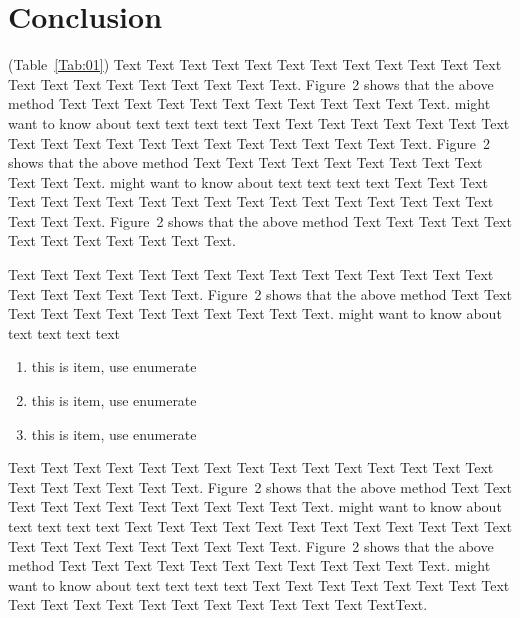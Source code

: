 \documentclass{bioinfo}
\begin{document}
%
%






\section{Conclusion}

(Table~\ref{Tab:01}) Text Text Text Text Text Text  Text Text Text
Text Text Text Text Text Text  Text Text Text Text Text Text.
Figure~2\vphantom{\ref{fig:02}} shows that the above method  Text
Text Text Text  Text Text Text Text Text Text  Text Text.
\citealp{Boffelli03} might want to know about  text text text text
Text Text Text Text Text Text  Text Text Text Text Text Text Text
Text Text  Text Text Text Text Text Text.
Figure~2\vphantom{\ref{fig:02}} shows that the above method  Text
Text Text Text  Text Text Text Text Text Text  Text Text.
\citealp{Boffelli03} might want to know about  text text text text
Text Text Text Text Text Text Text Text Text Text Text Text Text
Text Text  Text Text Text Text Text Text.
Figure~2\vphantom{\ref{fig:02}} shows that the above method  Text
Text Text Text  Text Text Text Text Text Text  Text Text.



Text Text Text Text Text Text  Text Text Text Text Text Text Text
Text Text  Text Text Text Text Text Text.
Figure~2\vphantom{\ref{fig:02}} shows that the above method  Text
Text Text Text  Text Text Text Text Text Text  Text Text.
\citealp{Boffelli03} might want to know about  text text text text

\begin{enumerate}
\item this is item, use enumerate
\item this is item, use enumerate
\item this is item, use enumerate
\end{enumerate}

Text Text Text Text Text Text Text Text Text Text Text Text Text
Text Text Text Text Text Text Text Text.
Figure~2\vphantom{\ref{fig:02}} shows\vadjust{\pagebreak} that the
above method  Text Text Text Text Text Text Text Text Text Text
Text Text.  \citealp{Boffelli03} might want to know about text
text text text Text Text Text Text Text Text  Text Text Text Text
Text Text Text Text Text Text Text Text Text Text Text.
Figure~2\vphantom{\ref{fig:02}} shows that the above method  Text
Text Text Text Text Text Text Text Text Text  Text Text.
\citealp{Boffelli03} might want to know about text text text text
Text Text Text Text Text Text  Text Text Text Text Text Text Text
Text Text Text Text Text Text Text\break Text.
\end{document}
